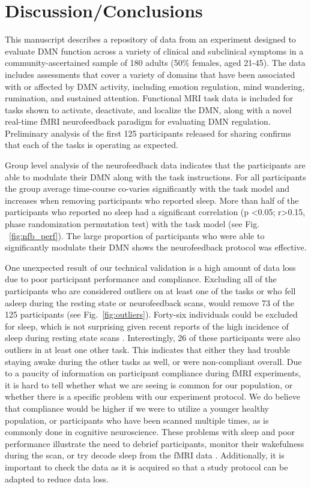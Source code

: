 \section{Discussion/Conclusions}

This manuscript describes a repository of data from an experiment designed to evaluate DMN function across a variety of clinical and subclinical symptoms in a community-ascertained sample of 180 adults (50\% females, aged 21-45). The data includes assessments that cover a variety of domains that have been associated with or affected by DMN activity, including emotion regulation, mind wandering, rumination, and sustained attention. Functional MRI task data is included for tasks shown to activate, deactivate, and localize the DMN, along with a novel real-time fMRI neurofeedback paradigm for evaluating DMN regulation. Preliminary analysis of the first 125 participants released for sharing confirms that each of the tasks is operating as expected.

Group level analysis of the neurofeedback data indicates that the participants are able to modulate their DMN along with the task instructions. For all participants the group average time-course co-varies significantly with the task model and increases when removing participants who reported sleep. More than half of the  participants who reported no sleep had a  significant correlation (p \textless 0.05; r\textgreater 0.15, phase randomization permutation test) with the task model (see Fig. ~\ref{fig:nfb_perf}). The large proportion of participants who were able to significantly modulate their DMN shows the neurofeedback protocol was effective.

One unexpected result of our technical validation is a high amount of data loss due to poor participant performance and compliance. Excluding all of the participants who are considered outliers on at least one of the tasks or who fell asleep during the resting state or neurofeedback scans, would remove 73 of the 125 participants (see Fig.~\ref{fig:outliers}). Forty-six individuals could be excluded for sleep, which is not surprising given recent reports of the high incidence of sleep during resting state scans \cite{Tagliazucchi2014}. Interestingly, 26 of these participants were also outliers in at least one other task. This indicates that either they had trouble staying awake during the other tasks as well, or were non-compliant overall. Due to a paucity of information on participant compliance during fMRI experiments, it is hard to tell whether what we are seeing is common for our population, or whether there is a specific problem with our experiment protocol. We do believe that compliance would be higher if we were to utilize a younger healthy population, or participants who have been scanned multiple times, as is commonly done in cognitive neuroscience. These problems with sleep and poor performance illustrate the need to debrief participants, monitor their wakefulness during the scan, or try decode sleep from the fMRI data \cite{Tagliazucchi2014}. Additionally, it is important to check the data as it is acquired so that a study protocol can be adapted to reduce data loss. 

